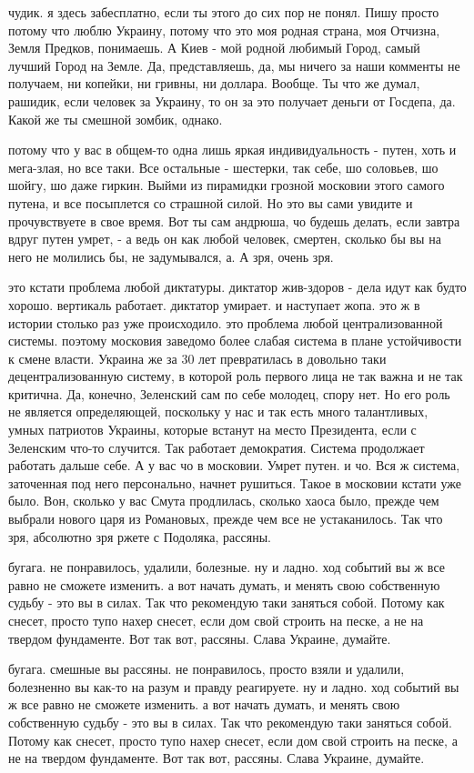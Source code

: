 чудик. я здесь забесплатно, если ты этого до сих пор не понял. Пишу просто
потому что люблю Украину, потому что это моя родная страна, моя Отчизна, Земля
Предков, понимаешь. А Киев - мой родной любимый Город, самый лучший Город на
Земле. Да, представляешь, да, мы ничего за наши комменты не получаем, ни
копейки, ни гривны, ни доллара. Вообще. Ты что же думал, рашидик, если человек
за Украину, то он за это получает деньги от Госдепа, да. Какой же ты смешной
зомбик, однако.

потому что у вас в общем-то одна лишь яркая индивидуальность - путен, хоть и
мега-злая, но все таки. Все остальные - шестерки, так себе, шо соловьев, шо
шойгу, шо даже гиркин. Выйми из пирамидки грозной московии этого самого путена,
и все посыплется со страшной силой. Но это вы сами увидите и прочувствуете в
свое время. Вот ты сам андрюша, чо будешь делать, если завтра вдруг путен
умрет, - а ведь он как любой человек, смертен, сколько бы вы на него не
молились бы, не задумывался, а. А зря, очень зря.

это кстати проблема любой диктатуры. диктатор жив-здоров - дела идут как будто
хорошо. вертикаль работает. диктатор умирает. и наступает жопа. это ж в истории
столько раз уже происходило. это проблема любой централизованной системы.
поэтому московия заведомо более слабая система в плане устойчивости к смене
власти. Украина же за 30 лет превратилась в довольно таки децентрализованную
систему, в которой роль первого лица не так важна и не так критична. Да,
конечно, Зеленский сам по себе молодец, спору нет. Но его роль не является
определяющей, поскольку у нас и так есть много талантливых, умных патриотов
Украины, которые встанут на место Президента, если с Зеленским что-то случится.
Так работает демократия. Система продолжает работать дальше себе. А у вас чо в
московии. Умрет путен. и чо. Вся ж система, заточенная под него персонально,
начнет рушиться. Такое в московии кстати уже было. Вон, сколько у вас Смута
продлилась, сколько хаоса было, прежде чем выбрали нового царя из Романовых,
прежде чем все не устаканилось. Так что зря, абсолютно зря ржете с Подоляка,
рассяны.

бугага. не понравилось, удалили, болезные. ну и ладно. ход событий вы ж все
равно не сможете изменить. а вот начать думать, и менять свою собственную
судьбу - это вы в силах. Так что рекомендую таки заняться собой. Потому как
снесет, просто тупо нахер снесет, если дом свой строить на песке, а не на
твердом фундаменте. Вот так вот, рассяны. Слава Украине, думайте.

бугага. смешные вы рассяны. не понравилось, просто взяли и удалили, болезненно
вы как-то на разум и правду реагируете. ну и ладно. ход событий вы ж все равно
не сможете изменить. а вот начать думать, и менять свою собственную судьбу -
это вы в силах. Так что рекомендую таки заняться собой. Потому как снесет,
просто тупо нахер снесет, если дом свой строить на песке, а не на твердом
фундаменте. Вот так вот, рассяны. Слава Украине, думайте.

